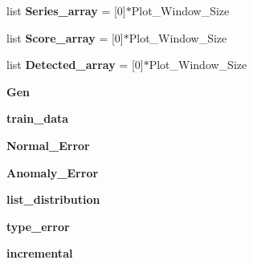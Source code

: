 \begin{DoxyCompactItemize}
\item 
list {\bfseries Series\+\_\+array} = \mbox{[}0\mbox{]}$\ast$Plot\+\_\+\+Window\+\_\+\+Size\hypertarget{namespaceSAD_1_1Main_aa4ac85bd58bc7ada91e88331bf010fc5}{}\label{namespaceSAD_1_1Main_aa4ac85bd58bc7ada91e88331bf010fc5}

\item 
list {\bfseries Score\+\_\+array} = \mbox{[}0\mbox{]}$\ast$Plot\+\_\+\+Window\+\_\+\+Size\hypertarget{namespaceSAD_1_1Main_a738a50efec4c74344d6e347fae5ea889}{}\label{namespaceSAD_1_1Main_a738a50efec4c74344d6e347fae5ea889}

\item 
list {\bfseries Detected\+\_\+array} = \mbox{[}0\mbox{]}$\ast$Plot\+\_\+\+Window\+\_\+\+Size\hypertarget{namespaceSAD_1_1Main_a6d0a457f18ca53dcd7ae7a1f72cb1407}{}\label{namespaceSAD_1_1Main_a6d0a457f18ca53dcd7ae7a1f72cb1407}

\item 
{\bfseries Gen}\hypertarget{namespaceSAD_1_1Main_a3ef046510be4354252d318d1f6143d87}{}\label{namespaceSAD_1_1Main_a3ef046510be4354252d318d1f6143d87}

\item 
{\bfseries train\+\_\+data}\hypertarget{namespaceSAD_1_1Main_a7b5828c804bfb2e3b401ff0b940585f2}{}\label{namespaceSAD_1_1Main_a7b5828c804bfb2e3b401ff0b940585f2}

\item 
{\bfseries Normal\+\_\+\+Error}\hypertarget{namespaceSAD_1_1Main_a7d540f3c8d2b8355bdad8842b747b718}{}\label{namespaceSAD_1_1Main_a7d540f3c8d2b8355bdad8842b747b718}

\item 
{\bfseries Anomaly\+\_\+\+Error}\hypertarget{namespaceSAD_1_1Main_acf0319135f26ed567ed49b3cac366e44}{}\label{namespaceSAD_1_1Main_acf0319135f26ed567ed49b3cac366e44}

\item 
{\bfseries list\+\_\+distribution}\hypertarget{namespaceSAD_1_1Main_ac138b603946ded523a35ed03ee8b39e2}{}\label{namespaceSAD_1_1Main_ac138b603946ded523a35ed03ee8b39e2}

\item 
{\bfseries type\+\_\+error}\hypertarget{namespaceSAD_1_1Main_aecd878ea0dc3ef0afe4c134d5ab84f4a}{}\label{namespaceSAD_1_1Main_aecd878ea0dc3ef0afe4c134d5ab84f4a}

\item 
{\bfseries incremental}\hypertarget{namespaceSAD_1_1Main_a1aa4102c7ff041fd9090af46f69f1a47}{}\label{namespaceSAD_1_1Main_a1aa4102c7ff041fd9090af46f69f1a47}


\end{DoxyCompactItemize}
